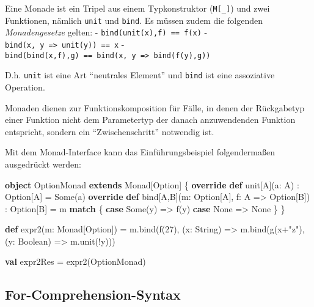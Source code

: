 \documentclass[]{article}
\newenvironment{Shaded}{}{}
\newcommand{\DataTypeTok}[1]{\textcolor[rgb]{0.56,0.13,0.00}{#1}}
\newcommand{\DecValTok}[1]{\textcolor[rgb]{0.25,0.63,0.44}{#1}}
\newcommand{\FunctionTok}[1]{\textcolor[rgb]{0.02,0.16,0.49}{#1}}
\newcommand{\KeywordTok}[1]{\textcolor[rgb]{0.00,0.44,0.13}{\textbf{#1}}}
\newcommand{\NormalTok}[1]{#1}
\newcommand{\StringTok}[1]{\textcolor[rgb]{0.25,0.44,0.63}{#1}}
\begin{document}
Eine Monade ist ein Tripel aus einem Typkonstruktor (\texttt{M{[}\_{]}})
und zwei Funktionen, nämlich \texttt{unit} und \texttt{bind}. Es müssen
zudem die folgenden \emph{Monadengesetze} gelten: -
\texttt{bind(unit(x),f)\ ==\ f(x)} -
\texttt{bind(x,\ y\ =\textgreater{}\ unit(y))\ ==\ x} -
\texttt{bind(bind(x,f),g)\ ==\ bind(x,\ y\ =\textgreater{}\ bind(f(y),g))}

D.h. \texttt{unit} ist eine Art ``neutrales Element'' und \texttt{bind}
ist eine assoziative Operation.

Monaden dienen zur Funktionskomposition für Fälle, in denen der
Rückgabetyp einer Funktion nicht dem Parametertyp der danach
anzuwendenden Funktion entspricht, sondern ein ``Zwischenschritt''
notwendig ist.

Mit dem Monad-Interface kann das Einführungsbeispiel folgendermaßen
ausgedrückt werden:

\begin{Shaded}
\begin{Highlighting}[]
\KeywordTok{object}\NormalTok{ OptionMonad }\KeywordTok{extends}\NormalTok{ Monad[Option] \{}
  \KeywordTok{override} \KeywordTok{def} \DataTypeTok{unit}\NormalTok{[A](a: A) : Option[A] = Some(a)}
  \KeywordTok{override} \KeywordTok{def}\NormalTok{ bind[A,B](m: Option[A], f: A =\textgreater{} Option[B]) : Option[B] = m }\KeywordTok{match}\NormalTok{ \{}
    \KeywordTok{case}\NormalTok{ Some(y) =\textgreater{} }\FunctionTok{f}\NormalTok{(y)}
    \KeywordTok{case}\NormalTok{ None =\textgreater{} None}
\NormalTok{  \}}
\NormalTok{\}}

\KeywordTok{def} \FunctionTok{expr2}\NormalTok{(m: Monad[Option]) =}
\NormalTok{  m.}\FunctionTok{bind}\NormalTok{(}\FunctionTok{f}\NormalTok{(}\DecValTok{27}\NormalTok{), (x: String) =\textgreater{}}
\NormalTok{    m.}\FunctionTok{bind}\NormalTok{(}\FunctionTok{g}\NormalTok{(x+}\StringTok{"z"}\NormalTok{), (y: Boolean) =\textgreater{}}
\NormalTok{      m.}\FunctionTok{unit}\NormalTok{(!y)))}
      
\KeywordTok{val}\NormalTok{ expr2Res = }\FunctionTok{expr2}\NormalTok{(OptionMonad)}
\end{Highlighting}
\end{Shaded}

\hypertarget{for-comprehension-syntax}{%
\subsection{For-Comprehension-Syntax}\label{for-comprehension-syntax}}
\end{document}

